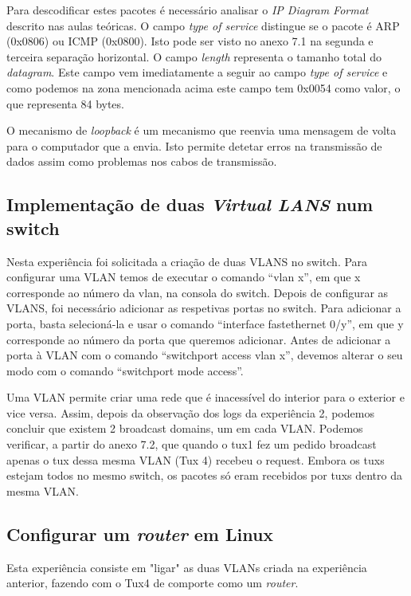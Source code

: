 \documentclass[a4paper]{article}
\begin{document}
Para descodificar estes pacotes é necessário analisar o \textit{IP Diagram Format} descrito nas aulas teóricas. O campo \textit{type of service} distingue se o pacote é ARP (0x0806) ou ICMP (0x0800). Isto pode ser visto no anexo 7.1 na segunda e terceira separação horizontal. O campo \textit{length} representa o tamanho total do \textit{datagram}. Este campo vem imediatamente a seguir ao campo \textit{type of service} e como podemos na zona mencionada acima este campo tem 0x0054 como valor, o que representa 84 bytes. 

O mecanismo de \textit{loopback} é um mecanismo que reenvia uma mensagem de volta para o computador que a envia. Isto permite detetar erros na transmissão de dados assim como problemas nos cabos de transmissão.

\subsection{Implementação de duas \textit{Virtual LANS} num switch}
Nesta experiência foi solicitada a criação de duas VLANS no switch. Para configurar uma VLAN temos de executar o comando “vlan x”, em que x corresponde ao número da vlan, na consola do switch. Depois de configurar as VLANS, foi necessário adicionar as respetivas portas no switch. Para adicionar a porta, basta selecioná-la e usar o comando “interface fastethernet 0/y”, em que y corresponde ao número da porta que queremos adicionar. Antes de adicionar a porta à VLAN com o comando “switchport access vlan x”, devemos alterar o seu modo com o comando “switchport mode access”.

Uma VLAN permite criar uma rede que é inacessível do interior para o exterior e vice versa. Assim, depois da observação dos logs da experiência 2, podemos concluir que existem 2 broadcast domains, um em cada VLAN. Podemos verificar, a partir do anexo 7.2, que quando o tux1 fez um pedido broadcast apenas o tux dessa mesma VLAN (Tux 4) recebeu o request. Embora os tuxs estejam todos no mesmo switch, os pacotes só eram recebidos por tuxs dentro da mesma VLAN.

\subsection{Configurar um \textit{router} em Linux}
Esta experiência consiste em "ligar" as duas VLANs criada na experiência anterior, fazendo com o Tux4 de comporte como um \textit{router}.
\end{document}
